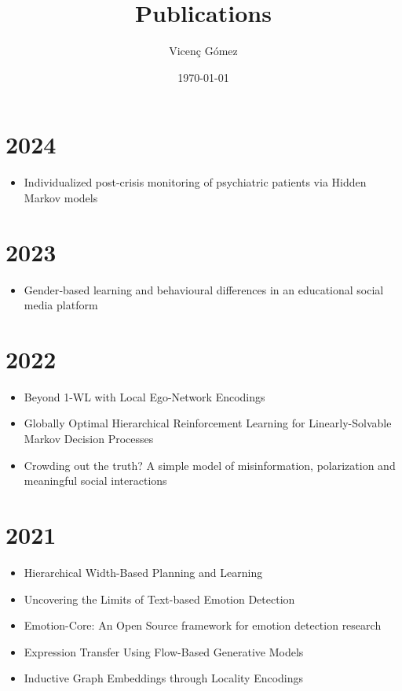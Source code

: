 \documentclass{article}
\title{Publications}
\author{Vicen\c{c} G\'omez}
\date{\today}
\begin{document}
\maketitle
\section*{2024}
\begin{itemize}
\item Individualized post-crisis monitoring of psychiatric patients via Hidden Markov models~\cite{garriga2024}
\end{itemize}


\section*{2023}
\begin{itemize}
\item Gender‐based learning and behavioural differences in an educational social media platform~\cite{theophilou2023}
\end{itemize}

\section*{2022}
\begin{itemize}
\item Beyond 1-WL with Local Ego-Network Encodings~\cite{alvarez-gonzalez2022beyond}
\item Globally Optimal Hierarchical Reinforcement Learning for Linearly-Solvable Markov Decision Processes~\cite{infante2022globally}
\item Crowding out the truth? A simple model of misinformation, polarization and meaningful social interactions~\cite{fabrizio-ic2s2-2022}
\end{itemize}
\section*{2021}
\begin{itemize}
\item Hierarchical Width-Based Planning and Learning~\cite{junyent2021hierarchical}
\item Uncovering the Limits of Text-based Emotion Detection~\cite{nur21b}
\item Emotion-Core: An Open Source framework for emotion detection research~\cite{nur21c}
\item Expression Transfer Using Flow-Based Generative Models~\cite{Valenzuela_2021_CVPR}
\item Inductive Graph Embeddings through Locality Encodings~\cite{nur21a}
\end{itemize}
\end{document}
